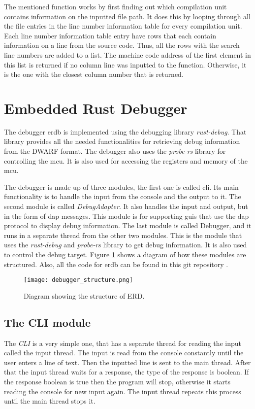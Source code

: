 The mentioned function works by first finding out which compilation unit contains information on the inputted file path.
It does this by looping through all the file entries in the line number information table for every compilation unit.
Each line number information table entry have rows that each contain information on a line from the source code.
Thus, all the rows with the search line numbers are added to a list.
The machine code address of the first element in this list is returned if no column line was inputted to the function.
Otherwise, it is the one with the closest column number that is returned.




\section{Embedded Rust Debugger}
The debugger \acrfull{erdb} is implemented using the debugging library \emph{rust-debug}.
That library provides all the needed functionalities for retrieving debug information from the \gls{DWARF} format.
The debugger also uses the \emph{probe-rs} library for controlling the \gls{mcu}.
It is also used for accessing the registers and memory of the \gls{mcu}.


The debugger is made up of three modules, the first one is called \acrshort{cli}.
Its main functionality is to handle the input from the console and the output to it.
The second module is called \emph{DebugAdapter}.
It also handles the input and output, but in the form of \gls{dap} messages.
This module is for supporting \glspl{gui} that use the \gls{dap} protocol to display debug information.
The last module is called Debugger, and it runs in a separate thread from the other two modules.
This is the module that uses the \emph{rust-debug} and \emph{probe-rs} library to get debug information.
It is also used to control the debug target.
Figure \ref{fig:ERDStruct} shows a diagram of how these modules are structured.
Also, all the code for \gls{erdb} can be found in this git repository \cite{erdb}.


\begin{figure}[h]
	\centering
	\texttt{[image: debugger\_structure.png]}
	\caption{Diagram showing the structure of ERD.}
	\label{fig:ERDStruct}
\end{figure}


\subsection{The CLI module}
The \emph{CLI} is a very simple one, that has a separate thread for reading the input called the input thread.
The input is read from the console constantly until the user enters a line of text.
Then the inputted line is sent to the main thread.
After that the input thread waits for a response, the type of the response is boolean.
If the response boolean is true then the program will stop, otherwise it starts reading the console for new input again.
The input thread repeats this process until the main thread stops it.


